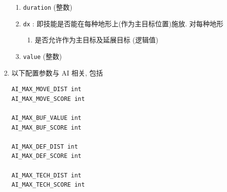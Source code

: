 \documentclass[UTF8, zihao=-4]{ctexart} %
\newcommand{\lcode}{\lstinline} % 段内插入代码
\begin{document}
\begin{enumerate}
\begin{enumerate}
                  \item \lcode{duration} (整数)
                  \item \lcode{dx} : 即技能是否能在每种地形上(作为主目标位置)施放. 对每种地形
                        \begin{enumerate}
                              \item 是否允许作为主目标及延展目标 (逻辑值)
                        \end{enumerate}
                  \item \lcode{value} (整数)
            \end{enumerate}
      \item 以下配置参数与 AI 相关, 包括
            \begin{lstlisting}
AI_MAX_MOVE_DIST int
AI_MAX_MOVE_SCORE int

AI_MAX_BUF_VALUE int
AI_MAX_BUF_SCORE int

AI_MAX_DEF_DIST int
AI_MAX_DEF_SCORE int

AI_MAX_TECH_DIST int
AI_MAX_TECH_SCORE int


\end{lstlisting}
\end{enumerate}
\end{document}
